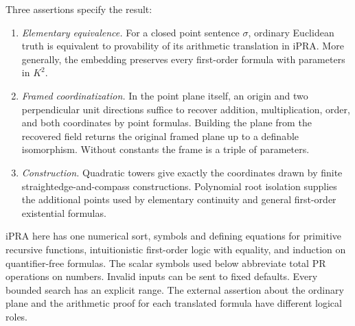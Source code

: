 \documentclass[11pt,letterpaper]{article}
\theoremstyle{definition}
\begin{document}
Three assertions specify the result:
\begin{enumerate}
\item \emph{Elementary equivalence.} For a closed point sentence
$\sigma$, ordinary Euclidean truth is equivalent to provability of
its arithmetic translation in iPRA. More generally, the embedding
preserves every first-order formula with parameters in $K^2$.
\item \emph{Framed coordinatization.} In the point plane itself,
an origin and two perpendicular unit directions suffice to recover
addition, multiplication, order, and both coordinates by point formulas.
Building the plane from the recovered field returns the original framed
plane up to a definable isomorphism. Without constants the frame is
a triple of parameters.
\item \emph{Construction.} Quadratic towers give exactly the coordinates
drawn by finite straightedge-and-compass constructions. Polynomial root
isolation supplies the additional points used by elementary continuity
and general first-order existential formulas.
\end{enumerate}
\noindent iPRA here has one numerical sort, symbols and defining equations
for primitive recursive functions, intuitionistic first-order logic with
equality, and induction on quantifier-free formulas. The scalar symbols
used below abbreviate total PR operations on numbers. Invalid inputs can
be sent to fixed defaults. Every bounded search has an explicit range.
The external assertion about the ordinary plane and the arithmetic proof
for each translated formula have different logical roles.
\end{document}

